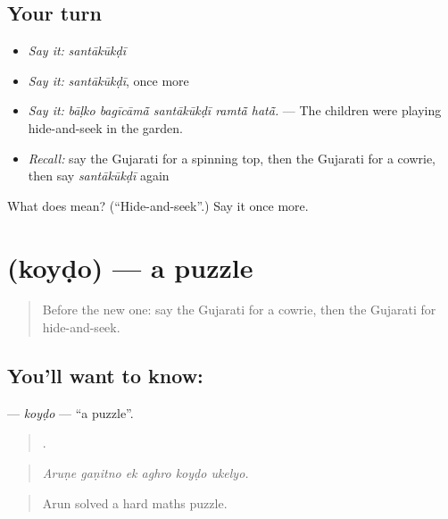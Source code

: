 \subsection*{Your turn}
\begin{itemize}
\raggedright
  \item \emph{Say it:} \emph{santākūkḍī}
  \item \emph{Say it:} \emph{santākūkḍī}, once more
  \item \emph{Say it:} \emph{bāḷko bagīcāmā̃ santākūkḍī ramtā̃ hatā̃.} — The children were playing hide-and-seek in the garden.
  \item \emph{Recall:} say the Gujarati for a spinning top, then the Gujarati for a cowrie, then say \emph{santākūkḍī} again
\end{itemize}

\begin{tcolorbox}[breakable,colback=teal!4,colframe=teal!35!black,title={Before you move on}]
What does  mean? (\textquotedblleft{}Hide-and-seek\textquotedblright{}.) Say it once more.
\end{tcolorbox}
\section[\texorpdfstring{\gu{કોયડો} (koyḍo)}{કોયડો (koyḍo)}]{ (koyḍo) — a puzzle}

\label{lesson:GU-C524-koydo}



\begin{quote}
Before the new one: say the Gujarati for a cowrie, then the Gujarati for hide-and-seek.
\end{quote}

\subsection*{You'll want to know: }
\textbf{} — \emph{koyḍo} — \textquotedblleft{}a puzzle\textquotedblright{}.

\begin{quote}
     .
\end{quote}

\begin{quote}
\emph{Aruṇe gaṇitno ek aghro koyḍo ukelyo.}
\end{quote}

\begin{quote}
Arun solved a hard maths puzzle.
\end{quote}

